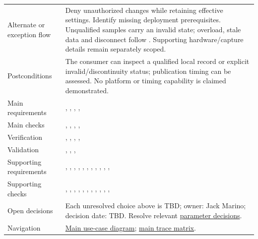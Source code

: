 \begin{tabularx}{\linewidth}{L{3.2cm}Y}
Alternate or exception flow & Deny unauthorized changes while retaining effective settings. Identify missing deployment prerequisites. Unqualified samples carry an invalid state; overload, stale data and disconnect follow . Supporting hardware/capture details remain separately scoped.\\
Postconditions & The consumer can inspect a qualified local record or explicit invalid/discontinuity status; publication timing can be assessed. No platform or timing capability is claimed demonstrated.\\
Main requirements & , , , , \\
Main checks & , , , , \\
Verification & , , , , \\
Validation & , , , \\
Supporting requirements & , , , , , , , , , , , \\
Supporting checks & , , , , , , , , , , , \\
Open decisions & Each unresolved choice above is TBD; owner: Jack Marino; decision date: TBD. Resolve relevant \hyperref[Table:RequirementParameters]{parameter decisions}.\\
Navigation & \hyperref[Figure:UseCaseDiagram]{Main use-case diagram}; \hyperref[Table:TraceabilityMatrix]{main trace matrix}.\\
\end{tabularx}
\normalsize
